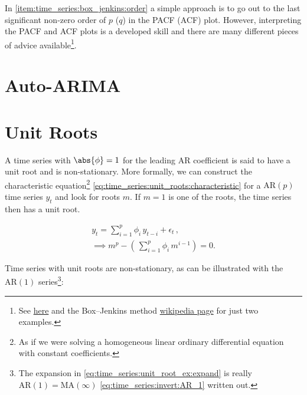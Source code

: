 In \cref{item:time_series:box_jenkins:order} a simple approach is to
go out to the last significant non-zero order of $p$ ($q$) in the PACF (ACF) plot.
However, interpreting the PACF and ACF plots is a developed skill
and there are many different pieces of advice
available\footnote{See
\href{https://people.duke.edu/~rnau/411arim3.htm}{here}
and the Box--Jenkins method
\href{https://en.wikipedia.org/wiki/Box\%E2\%80\%93Jenkins\_method\#Autocorrelation\_and\_partial\_autocorrelation\_plots}{wikipedia page}
for just two examples.}.

\section{Auto-ARIMA}
\label{time_series:auto_ARIMA}

\section{Unit Roots}
\label{time_series:unit_root}

A time series with $\abs{\phi} = 1$ for the leading AR coefficient
is said to have a unit root and is non-stationary.
More formally, we can construct the characteristic
equation\footnote{As if we were solving a
homogeneous linear ordinary differential equation with constant coefficients.} \cref{eq:time_series:unit_roots:characteristic}
for a $\text{AR}\left(p\right)$ time series $y_{t}$ and look for roots $m$.
If $m=1$ is one of the roots, the time series then has a unit root.

\begin{subequations}\label{eq:time_series:unit_roots}
\begin{gather}
y_{t} = \sum_{i=1}^{p} \phi_{i}\, y_{t-i} + \epsilon_{t}\,, \label{eq:time_series:unit_roots:y} \\
\implies m^{p} - \left(\, \sum_{i=1}^{p} \phi_{i}\, m^{i-1} \right) = 0. \label{eq:time_series:unit_roots:characteristic}
\end{gather}
\end{subequations}

Time series with unit roots are non-stationary,
as can be illustrated with the $\text{AR}\left(1\right)$ series\footnote{The expansion
in \cref{eq:time_series:unit_root_ex:expand} is really
$\text{AR}\left(1\right) = \text{MA}\left(\infty\right)$ \cref{eq:time_series:invert:AR_1} written out.}:

